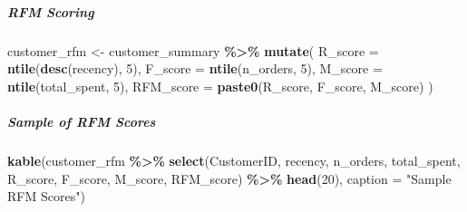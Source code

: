 \documentclass[
]{article}
\newenvironment{Shaded}{\begin{snugshade}}{\end{snugshade}}
\newcommand{\AttributeTok}[1]{\textcolor[rgb]{0.13,0.29,0.53}{#1}}
\newcommand{\DecValTok}[1]{\textcolor[rgb]{0.00,0.00,0.81}{#1}}
\newcommand{\FunctionTok}[1]{\textcolor[rgb]{0.13,0.29,0.53}{\textbf{#1}}}
\newcommand{\NormalTok}[1]{#1}
\newcommand{\OtherTok}[1]{\textcolor[rgb]{0.56,0.35,0.01}{#1}}
\newcommand{\SpecialCharTok}[1]{\textcolor[rgb]{0.81,0.36,0.00}{\textbf{#1}}}
\newcommand{\StringTok}[1]{\textcolor[rgb]{0.31,0.60,0.02}{#1}}
\begin{document}
\subparagraph{RFM Scoring}\label{rfm-scoring}

\begin{Shaded}
\begin{Highlighting}[]
\NormalTok{customer\_rfm }\OtherTok{\textless{}{-}}\NormalTok{ customer\_summary }\SpecialCharTok{\%\textgreater{}\%}
  \FunctionTok{mutate}\NormalTok{(}
    \AttributeTok{R\_score =} \FunctionTok{ntile}\NormalTok{(}\FunctionTok{desc}\NormalTok{(recency), }\DecValTok{5}\NormalTok{),}
    \AttributeTok{F\_score =} \FunctionTok{ntile}\NormalTok{(n\_orders, }\DecValTok{5}\NormalTok{),}
    \AttributeTok{M\_score =} \FunctionTok{ntile}\NormalTok{(total\_spent, }\DecValTok{5}\NormalTok{),}
    \AttributeTok{RFM\_score =} \FunctionTok{paste0}\NormalTok{(R\_score, F\_score, M\_score)}
\NormalTok{  )}
\end{Highlighting}
\end{Shaded}

\subparagraph{Sample of RFM Scores}\label{sample-of-rfm-scores}

\begin{Shaded}
\begin{Highlighting}[]
\FunctionTok{kable}\NormalTok{(customer\_rfm }\SpecialCharTok{\%\textgreater{}\%}
  \FunctionTok{select}\NormalTok{(CustomerID, recency, n\_orders, total\_spent, R\_score, F\_score, M\_score, RFM\_score) }\SpecialCharTok{\%\textgreater{}\%}
  \FunctionTok{head}\NormalTok{(}\DecValTok{20}\NormalTok{), }\AttributeTok{caption =} \StringTok{"Sample RFM Scores"}\NormalTok{)}
\end{Highlighting}
\end{Shaded}
\end{document}
